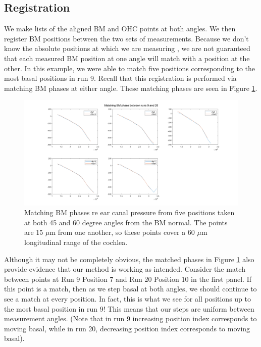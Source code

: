 \documentclass{article}
\begin{document}
\subsection{Registration}
\par{ We make lists of the aligned BM and OHC points at both angles. We then register BM positions between the two sets of measurements. Because we don't know the absolute positions at which we are measuring , we are not guaranteed that each measured BM position at one angle will match with a position at the other. In this example, we were able to match five positions corresponding to the most basal positions in run 9. Recall that this registration is performed via matching BM phases at either angle. These matching phases are seen in Figure \ref{BMmatch}.}
\begin{figure}
	\centering
	\includegraphics[width=\textwidth]{"Figures/Aligning BM9 and BM20.png"}
	\caption{Matching BM phases re ear canal pressure from five positions taken at both 45 and 60 degree angles from the BM normal. The points are 15 $\mu$m from one another, so these points cover a 60 $\mu$m longitudinal range of the cochlea.}
	\label{BMmatch}
\end{figure}
\par{Although it may not be completely obvious, the matched phases in Figure \ref{BMmatch} also provide evidence that our method is working as intended. Consider the match between points at Run 9 Position 7 and Run 20 Position 10 in the first panel. If this point is a match, then as we step basal at both angles, we should continue to see a match at every position. In fact, this is what we see for all positions up to the most basal position in run 9! This means that our steps are uniform between measurement angles. (Note that in run 9 increasing position index corresponds to moving basal, while in run 20, decreasing position index corresponds to moving basal).}
\end{document}
